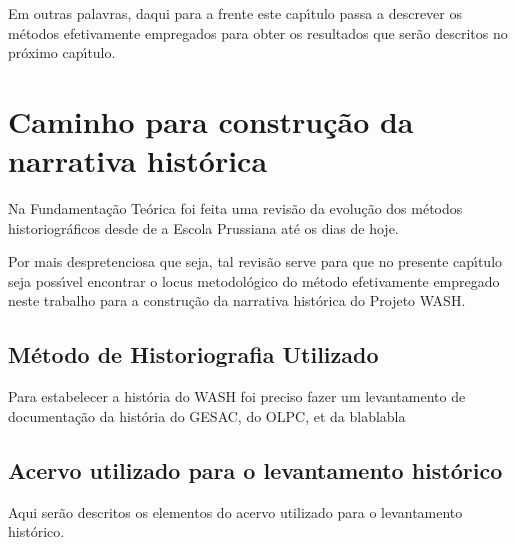 \documentclass[
12pt,		%
openright,	%
twoside,  %
a4paper,			%
chapter=TITLE,		%
english,			%
french,				%
spanish,			%
brazil				%
]{USPSC-classe/USPSC_RedarTex}
\begin{document}
Em outras palavras, daqui para a frente este cap\'{\i}tulo passa a descrever os m\'etodos efetivamente empregados para obter os resultados que ser\~ao descritos no pr\'oximo cap\'{\i}tulo.










\section[Caminho para constru\c{c}\~ao da narrativa hist\'orica]{Caminho para constru\c{c}\~ao da narrativa hist\'orica}\label{Caminho para constru\c{c}\~ao da narrativa hist\'orica}
Na Fundamenta\c{c}\~ao Te\'orica foi feita uma revis\~ao da evolu\c{c}\~ao dos m\'etodos historiogr\'aficos desde de a Escola Prussiana at\'e os dias de hoje.










Por mais despretenciosa que seja, tal revis\~ao serve para que no presente cap\'{\i}tulo seja poss\'{\i}vel encontrar o locus metodol\'ogico do m\'etodo efetivamente empregado neste trabalho para a constru\c{c}\~ao da narrativa hist\'orica do Projeto WASH.










\subsection[M\'etodo de Historiografia Utilizado ]{M\'etodo de Historiografia Utilizado }\label{M\'etodo de Historiografia Utilizado }
Para estabelecer a hist\'oria do WASH foi preciso fazer um levantamento de documenta\c{c}\~ao da hist\'oria do GESAC, do OLPC, et da blablabla










\subsection[Acervo utilizado para o levantamento hist\'orico]{Acervo utilizado para o levantamento hist\'orico}\label{Acervo utilizado para o levantamento hist\'orico}
Aqui ser\~ao descritos os elementos do acervo utilizado para o levantamento hist\'orico.
\end{document}
